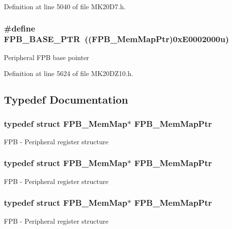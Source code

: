 Definition at line 5040 of file M\+K20\+D7.\+h.

\subsubsection[{\texorpdfstring{F\+P\+B\+\_\+\+B\+A\+S\+E\+\_\+\+P\+TR}{FPB_BASE_PTR}}]{\setlength{\rightskip}{0pt plus 5cm}\#define F\+P\+B\+\_\+\+B\+A\+S\+E\+\_\+\+P\+TR~(({\bf F\+P\+B\+\_\+\+Mem\+Map\+Ptr})0x\+E0002000u)}\hypertarget{group___f_p_b___peripheral_ga95d994c97f967ce02339465def6bac95}{}\label{group___f_p_b___peripheral_ga95d994c97f967ce02339465def6bac95}
Peripheral F\+PB base pointer 

Definition at line 5624 of file M\+K20\+D\+Z10.\+h.



\subsection{Typedef Documentation}
\subsubsection[{\texorpdfstring{F\+P\+B\+\_\+\+Mem\+Map\+Ptr}{FPB_MemMapPtr}}]{\setlength{\rightskip}{0pt plus 5cm}typedef struct {\bf F\+P\+B\+\_\+\+Mem\+Map}$\ast$ {\bf F\+P\+B\+\_\+\+Mem\+Map\+Ptr}}\hypertarget{group___f_p_b___peripheral_gaffb8b5a06bae98ff71e1337bfd371172}{}\label{group___f_p_b___peripheral_gaffb8b5a06bae98ff71e1337bfd371172}
F\+PB -\/ Peripheral register structure 
\subsubsection[{\texorpdfstring{F\+P\+B\+\_\+\+Mem\+Map\+Ptr}{FPB_MemMapPtr}}]{\setlength{\rightskip}{0pt plus 5cm}typedef struct {\bf F\+P\+B\+\_\+\+Mem\+Map}$\ast$ {\bf F\+P\+B\+\_\+\+Mem\+Map\+Ptr}}\hypertarget{group___f_p_b___peripheral_gaffb8b5a06bae98ff71e1337bfd371172}{}\label{group___f_p_b___peripheral_gaffb8b5a06bae98ff71e1337bfd371172}
F\+PB -\/ Peripheral register structure 
\subsubsection[{\texorpdfstring{F\+P\+B\+\_\+\+Mem\+Map\+Ptr}{FPB_MemMapPtr}}]{\setlength{\rightskip}{0pt plus 5cm}typedef struct {\bf F\+P\+B\+\_\+\+Mem\+Map}$\ast$ {\bf F\+P\+B\+\_\+\+Mem\+Map\+Ptr}}\hypertarget{group___f_p_b___peripheral_gaffb8b5a06bae98ff71e1337bfd371172}{}\label{group___f_p_b___peripheral_gaffb8b5a06bae98ff71e1337bfd371172}
F\+PB -\/ Peripheral register structure 